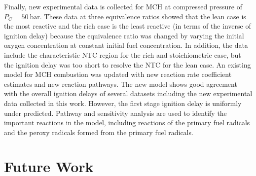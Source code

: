 \documentclass[../main.tex]{subfiles}
\begin{document}
Finally, new experimental data is collected for MCH at compressed
pressure of $P_C=\SI{50}{\bar}$. These data at three equivalence ratios
showed that the lean case is the most reactive and the rich case is the
least reactive (in terms of the inverse of ignition delay) because the
equivalence ratio was changed by varying the initial oxygen concentration
at constant initial fuel concentration. In addition, the data include the
characteristic NTC region for the rich and stoichiometric case, but the
ignition delay was too short to resolve the NTC for the lean case. An
existing model for MCH combustion was updated with new reaction rate
coefficient estimates and new reaction pathways. The new model shows
good agreement with the overall ignition delays of several datasets
including the new experimental data collected in this work. However,
the first stage ignition delay is uniformly under predicted. Pathway
and sensitivity analysis are used to identify the important reactions in
the model, including reactions of the primary fuel radicals and the peroxy
radicals formed from the primary fuel radicals.

\section{Future Work}
\label{sec:future-work}
\end{document}
